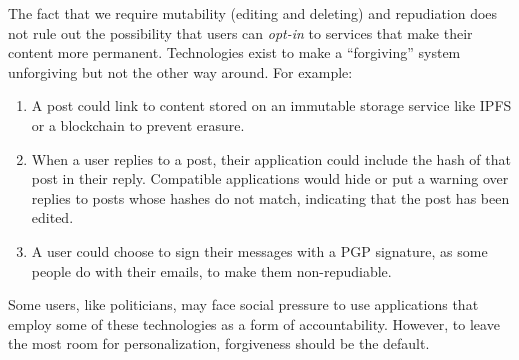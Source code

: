 The fact that we require mutability (editing and deleting) and repudiation does not rule
out the possibility that users can \emph{opt-in} to services that make their content more permanent.
Technologies exist to make a ``forgiving'' system unforgiving but not the other way around.
For example:
\begin{enumerate}
\item
A post could link to content stored on an immutable storage service like IPFS
or a blockchain to prevent erasure.
\item
When a user replies to a post, their application could include the hash
of that post in their reply. Compatible applications would
hide or put a warning over replies to posts whose hashes do not match,
indicating that the post has been edited.
\item
A user could choose to sign their messages with a PGP signature,
as some people do with their emails, to make them non-repudiable.
\end{enumerate}
Some users, like politicians, may face social pressure to use applications
that employ some of these technologies as a form of accountability.
However, to leave the most room for personalization, forgiveness should be the default.
